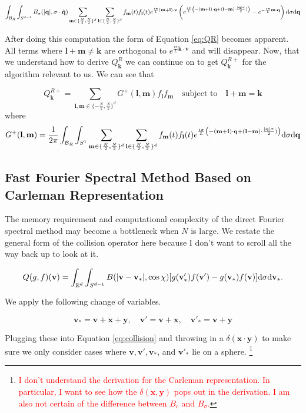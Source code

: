 \documentclass{article}
\def\t{\text}
\def\b{\mathbf}
\begin{document}
\begin{gather*}
    \int_{\mathcal{B}_R} \int_{S^{d-1}} B_{\sigma}(|\b q|, \sigma \cdot \hat{\b q}) \sum_{\b m \in \{\frac{N}{2}, \frac{N}{2} \}^d} \sum_{\b l \in \{\frac{N}{2}, \frac{N}{2} \}^d} f_{\b m}(t) f_{\b l}(t) e^{\frac{i \pi}{L} (\b m + \b l) \cdot \b v} \left( e^{\frac{i \pi}{L} \left( - (\b m + \b l) \cdot \b q + (\b l - \b m) \cdot \frac{|\b q| \sigma}{2} ) \right)}  - e^{- \frac{i \pi}{L} \b m \cdot \b q} \right) \t d \sigma \t d \b q \\ 
\end{gather*}

After doing this computation the form of Equation \ref{eq:QR} becomes apparent. All terms where $\b l + \b m \neq \b k$ are orthogonal to $e^{\frac{i \pi}{L} \b k \cdot \b v}$ and will disappear. Now, that we understand how to derive $Q^R_{\b k}$ we can continue on to get $Q^{R+}_{\b k}$ for the algorithm relevant to us. We can see that 

\[
Q^{R+}_{\b k} = \sum_{\b l,\b m \in \{-\frac{N}{2}, \frac{N}{2}\}^d} G^+(\b l,\b m) f_{\b l} f_{\b m} \quad \text{subject to} \quad \b l + \b m = \b k
\]
where 
\[
    G^+(\b l,\b m) = \frac{1}{2 \pi} \int_{\mathcal{B}_R} \int_{S^{1}} \sum_{\b m \in \{\frac{N}{2}, \frac{N}{2} \}^d} \sum_{\b l \in \{\frac{N}{2}, \frac{N}{2} \}^d} f_{\b m}(t) f_{\b l}(t) e^{\frac{i \pi}{L} \left( - (\b m + \b l) \cdot \b q + (\b l - \b m) \cdot \frac{|\b q| \sigma}{2} ) \right)}  \t d \sigma \t d \b q
\]

\subsection*{Fast Fourier Spectral Method Based on Carleman Representation}

The memory requirement and computational complexity of the direct Fourier spectral method may become a bottleneck when $N$ is large. We restate the general form of the collision operator here because I don't want to scroll all the way back up to look at it.

\[
    Q(g,f)(\b v) = \int_{\mathbb{R}^d} \int_{S^{d-1}} B(|\b v - \b v_*|,\cos \chi)[g(\b v_*') f(\b v') - g(\b v_*) f(\b v)] \t d \sigma \t d \b v_*.
\]

We apply the following change of variables.

\[
    \b v_* = \b v + \b x + \b y, \quad \b v' = \b v + \b x, \quad \b v'_* = \b v + \b y
\]

Plugging these into Equation \ref{eq:collision} and throwing in a $\delta(\b x \cdot \b y)$ to make sure we only consider cases where $\b v, \b v', \b v_*$, and $\b v'_*$ lie on a sphere. \footnote{\textcolor{red}{I don't understand the derivation for the Carleman representation. In particular, I want to see how the $\delta(\b x, \b y)$ pops out in the derivation. I am also not certain of the difference between $B_c$ and $B_\sigma$.}}
\end{document}
